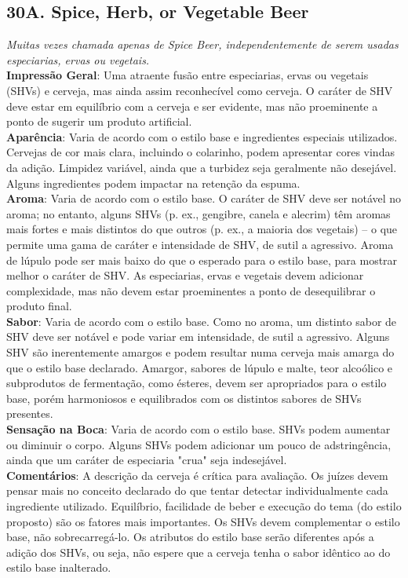 \subsection*{30A. Spice, Herb, or Vegetable Beer}
\textit{Muitas vezes chamada apenas de Spice Beer, independentemente de serem usadas especiarias, ervas ou vegetais.}\\
\textbf{Impressão Geral}: Uma atraente fusão entre especiarias, ervas ou vegetais (SHVs) e cerveja, mas ainda assim reconhecível como cerveja. O caráter de SHV deve estar em equilíbrio com a cerveja e ser evidente, mas não proeminente a ponto de sugerir um produto artificial.\\
\textbf{Aparência}: Varia de acordo com o estilo base e ingredientes especiais utilizados. Cervejas de cor mais clara, incluindo o colarinho, podem apresentar cores vindas da adição. Limpidez variável, ainda que a turbidez seja geralmente não desejável. Alguns ingredientes podem impactar na retenção da espuma.\\
\textbf{Aroma}: Varia de acordo com o estilo base. O caráter de SHV deve ser notável no aroma; no entanto, alguns SHVs (p. ex., gengibre, canela e alecrim) têm aromas mais fortes e mais distintos do que outros (p. ex., a maioria dos vegetais) – o que permite uma gama de caráter e intensidade de SHV, de sutil a agressivo. Aroma de lúpulo pode ser mais baixo do que o esperado para o estilo base, para mostrar melhor o caráter de SHV. As especiarias, ervas e vegetais devem adicionar complexidade, mas não devem estar proeminentes a ponto de desequilibrar o produto final.\\
\textbf{Sabor}: Varia de acordo com o estilo base. Como no aroma, um distinto sabor de SHV deve ser notável e pode variar em intensidade, de sutil a agressivo. Alguns SHV são inerentemente amargos e podem resultar numa cerveja mais amarga do que o estilo base declarado. Amargor, sabores de lúpulo e malte, teor alcoólico e subprodutos de fermentação, como ésteres, devem ser apropriados para o estilo base, porém harmoniosos e equilibrados com os distintos sabores de SHVs presentes.\\
\textbf{Sensação na Boca}: Varia de acordo com o estilo base. SHVs podem aumentar ou diminuir o corpo. Alguns SHVs podem adicionar um pouco de adstringência, ainda que um caráter de especiaria "crua" seja indesejável.\\
\textbf{Comentários}: A descrição da cerveja é crítica para avaliação. Os juízes devem pensar mais no conceito declarado do que tentar detectar individualmente cada ingrediente utilizado. Equilíbrio, facilidade de beber e execução do tema (do estilo proposto) são os fatores mais importantes. Os SHVs devem complementar o estilo base, não sobrecarregá-lo. Os atributos do estilo base serão diferentes após a adição dos SHVs, ou seja, não espere que a cerveja tenha o sabor idêntico ao do estilo base inalterado.\\
